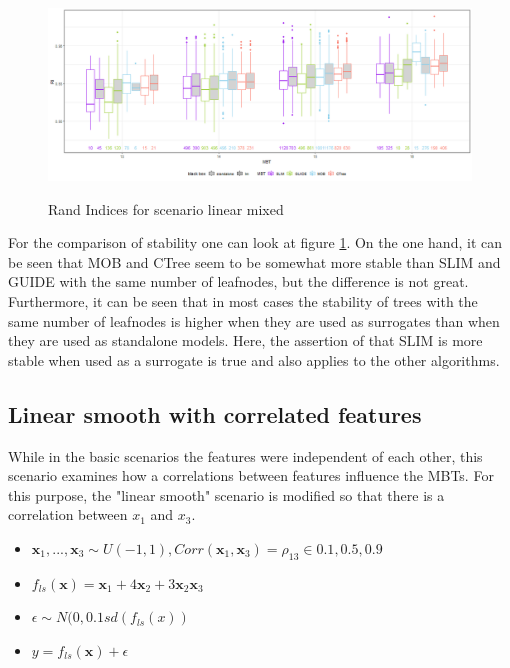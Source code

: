 \begin{figure}[!htb]
    \includegraphics[width=16cm]{Figures/simulations/batchtools/basic_scenarios/linear_mixed/lm_1000_standalone_lm_sta.png}
    \label{fig:lm_1000_standalone_lm_sta}
    \caption{Rand Indices for scenario linear mixed}
\end{figure}

For the comparison of stability one can look at figure \ref{fig:lm_1000_standalone_lm_sta}. On the one hand, it can be seen that MOB and CTree seem to be somewhat more stable than SLIM and GUIDE with the same number of leafnodes, but the difference is not great. Furthermore, it can be seen that in most cases the stability of trees with the same number of leafnodes is higher when they are used as surrogates than when they are used as standalone models. Here, the assertion of \citep{Hu.2020} that SLIM is more stable when used as a surrogate is true and also applies to the other algorithms.


\newpage
\subsection{Linear smooth with correlated features}
While in the basic scenarios the features were independent of each other, this scenario examines how a correlations between features influence the MBTs. For this purpose, the "linear smooth" scenario is modified so that there is a correlation between $x_1$ and $x_3$.
\begin{itemize}
    \item $\textbf{x}_1,..., \textbf{x}_3 \sim U(-1,1), Corr(\textbf{x}_1, \textbf{x}_3) = \rho_{13} \in {0.1, 0.5, 0.9}$
    \item $ f_{ls}(\textbf{x}) = \textbf{x}_1 + 4   \textbf{x}_2 + 3   \textbf{x}_2   \textbf{x}_3 $
    \item $\epsilon \sim N(0, 0.1 sd(f_{ls}(x))$
    \item $y = f_{ls}(\textbf{x}) + \epsilon$
\end{itemize}

